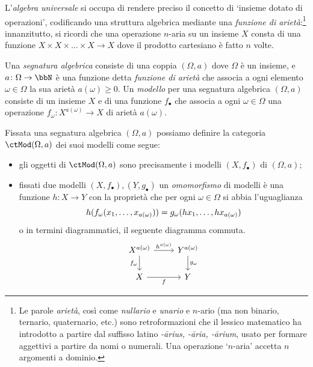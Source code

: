 L'\emph{algebra universale} si occupa di rendere preciso il concetto di `insieme dotato di operazioni', codificando una struttura algebrica mediante una \emph{funzione di arietà}:\footnote{Le parole \emph{arietà}, così come \emph{nullario} e \emph{unario} e \(n\)-ario (ma non binario, ternario, quaternario, etc.) sono retroformazioni che il lessico matematico ha introdotto a partire dal suffisso latino \emph{-\={a}rius, -\=aria, -\=arium}, usato per formare aggettivi a partire da nomi o numerali. Una operazione `\(n\)-aria' accetta \(n\) argomenti a dominio.} innanzitutto, si ricordi che una operazione \(n\)-aria su un insieme \(X\) consta di una funzione \(X\times X\times\dots\times X \to X\) dove il prodotto cartesiano è fatto \(n\) volte.
\begin{example}\label{ex_cat_sigma_strutture}
 Una \emph{segnatura algebrica} consiste di una coppia \((\Omega, a)\) dove \(\Omega\) è un insieme, e \(a \colon \Omega \to \bbN\) è una funzione detta \emph{funzione di arietà} che associa a ogni elemento \(\omega \in \Omega\) la sua arietà \(a(\omega)\ge 0\). Un \emph{modello} per una segnatura algebrica \((\Omega,a)\) consiste di un insieme \(X\) e di una funzione \(f_\bullet\) che associa a ogni \(\omega\in\Omega\) una operazione \(f_\omega \colon X^{a(\omega)} \to X\) di arietà \(a(\omega)\).

 Fissata una segnatura algebrica \((\Omega,a)\) possiamo definire la categoria \(\ctMod(\Omega,a)\) dei suoi modelli come segue:
 \begin{itemize}
  \item gli oggetti di \(\ctMod(\Omega,a)\) sono precisamente i modelli \((X,f_\bullet)\) di \((\Omega,a)\);
  \item fissati due modelli \((X,f_\bullet), (Y,g_\bullet)\) un \emph{omomorfismo} di modelli è una funzione \(h \colon X\to Y\) con la proprietà che per ogni \(\omega\in\Omega\) si abbia l'uguaglianza
        \[h(f_\omega(\tup x{a(\omega)},)) = g_\omega(\tup {hx}{a(\omega)},)\]
        o in termini diagrammatici, il seguente diagramma commuta.
        \[
         \begin{tikzcd}
          X^{a(\omega)} \ar{r}{h^{a(\omega)}} \ar[d, "f_\omega"'] & Y^{a(\omega)} \ar{d}{g_\omega} \\
          X \ar[r, "f"']& Y
         \end{tikzcd}
        \]
 \end{itemize}
\end{example}
